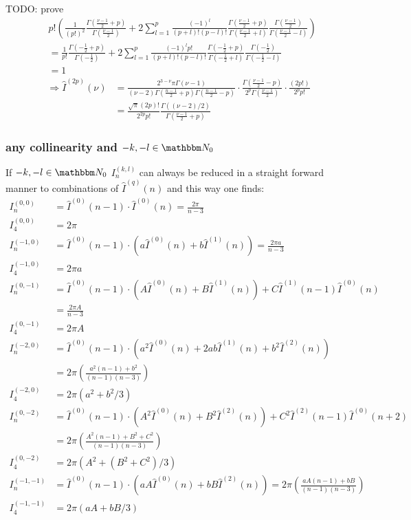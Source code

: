 \documentclass[
  english,		%
  a4paper,		%
  11pt,			%
  DIV=12,
  titlepage,
  toc=bibnumbered,
  parskip=full,  	%
  headings=normal,
  BCOR=12mm,
  numbers=noenddot
]{scrartcl}
\begin{document}
TODO: prove 
\begin{align}
&p! \left(\frac 1 {(p!)^2} \frac{\Gamma(\frac{\nu-1} 2+p)}{\Gamma(\frac{\nu-1} 2)} + 2\sum\limits_{l=1}^{p}\frac{(-1)^l}{(p+l)!(p-l)!}\frac{\Gamma(\frac{\nu-1} 2+p)}{\Gamma(\frac{\nu-1} 2+l)}\frac{\Gamma(\frac{\nu-1} 2)}{\Gamma(\frac{\nu-1} 2-l)}\right)\\
&= \frac {1} {p!}\frac{\Gamma(-\frac{1}2+p)}{\Gamma(-\frac{1}2)} + 2\sum\limits_{l=1}^{p}\frac{(-1)^l p!}{(p+l)!(p-l)!}\frac{\Gamma(-\frac{1} 2+p)}{\Gamma(-\frac{1} 2+l)}\frac{\Gamma(-\frac{1} 2)}{\Gamma(-\frac{1} 2-l)}\\
&= 1
\end{align}
\begin{align}
\Rightarrow \hat I^{(2p)}(\nu) &=\frac {2^{3-\nu}\pi\Gamma(\nu-1)}{(\nu-2)\Gamma(\frac{n-1} 2+p)\Gamma(\frac{n-1} 2-p)} \cdot \frac{\Gamma(\frac{\nu-1} 2-p)}{2^{p}\Gamma(\frac{\nu-1} 2)} \cdot \frac{(2p!)}{2^p p!}\\
 &= \frac{\sqrt{\pi}(2p)!}{2^{2p}p!} \frac {\Gamma((\nu-2)/2)} {\Gamma(\frac{\nu-1}2+p)}
\end{align}

\subsubsection{any collinearity and $-k,-l\in\mathbbm N_0$}
If $-k,-l\in\mathbbm N_0$ $I_{n}^{(k,l)}$ can always be reduced in a straight forward manner to combinations of $\hat I^{(q)}(n)$ and this way one finds\cite[Ch. 5]{Bojak:2000eu}\cite[App. C]{PhysRevD.40.54}:
\begin{align}
I^{(0,0)}_{n} &= \hat I^{(0)}(n-1) \cdot \hat I^{(0)}(n) = \frac{2\pi}{n-3}\\
I^{(0,0)}_{4} &= 2\pi\\
I^{(-1,0)}_{n} &= \hat I^{(0)}(n-1) \cdot (a\hat I^{(0)}(n)+b\hat I^{(1)}(n)) = \frac{2\pi a}{n-3}\\
I^{(-1,0)}_{4} &= 2\pi a \\
I^{(0,-1)}_{n} &= \hat I^{(0)}(n-1) \cdot (A\hat I^{(0)}(n) + B\hat I^{(1)}(n)) + C\hat I^{(1)}(n-1)\hat I^{(0)}(n)\\
 &= \frac{2\pi A}{n-3}\\
I^{(0,-1)}_{4} &=2\pi A\\
I^{(-2,0)}_{n} &= \hat I^{(0)}(n-1) \cdot (a^2\hat I^{(0)}(n)+2ab\hat I^{(1)}(n) + b^2 \hat I^{(2)}(n))\\
 &= 2\pi\left(\frac{a^2(n-1)+b^2}{(n-1)(n-3)}\right)\\
I^{(-2,0)}_{4} &= 2\pi(a^2 + b^2/3) \\
I^{(0,-2)}_{n} &= \hat I^{(0)}(n-1) \cdot (A^2\hat I^{(0)}(n) + B^2\hat I^{(2)}(n)) + C^2\hat I^{(2)}(n-1)\hat I^{(0)}(n+2) \\
 &= 2\pi\left(\frac{A^2(n-1)+B^2+C^2}{(n-1)(n-3)}\right)\\
I^{(0,-2)}_{4} &= 2\pi(A^2+(B^2+C^2)/3) \\
I^{(-1,-1)}_{n} &= \hat I^{(0)}(n-1) \cdot (a A\hat I^{(0)}(n) + b B \hat I^{(2)}(n)) = 2\pi\left(\frac{aA(n-1)+bB}{(n-1)(n-3)}\right)\\
I^{(-1,-1)}_{4} &= 2\pi(aA + bB/3)
\end{align}
\end{document}
